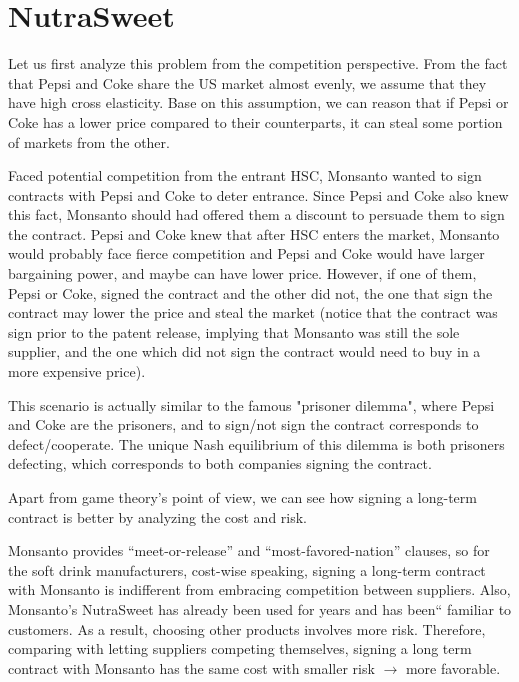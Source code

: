 \documentclass[a4paper]{article}
\begin{document}
    \section{NutraSweet}
    \begin{answer}[problem]
    Let us first analyze this problem from the competition perspective. From the fact that Pepsi and Coke share the US market almost evenly, we assume that they have high cross elasticity. Base on this assumption, we can reason that if Pepsi or Coke has a lower price compared to their counterparts, it can steal some portion of markets from the other.
    
    Faced potential competition from the entrant HSC, Monsanto wanted to sign contracts with Pepsi and Coke to deter entrance. Since Pepsi and Coke also knew this fact, Monsanto should had offered them a discount to persuade them to sign the contract. Pepsi and Coke knew that after HSC enters the market, Monsanto would probably face fierce competition and Pepsi and Coke would have larger bargaining power, and maybe can have lower price. However, if one of them, Pepsi or Coke, signed the contract and the other did not, the one that sign the contract may lower the price and steal the market (notice that the contract was sign prior to the patent release, implying that Monsanto was still the sole supplier, and the one which did not sign the contract would need to buy in a more expensive price). 
    
    This scenario is actually similar to the famous "prisoner dilemma", where Pepsi and Coke are the prisoners, and to sign/not sign the contract corresponds to defect/cooperate. The unique Nash equilibrium of this dilemma is both prisoners defecting, which corresponds to both companies signing the contract.
    
    Apart from game theory's point of view, we can see how signing a long-term contract is better by analyzing the cost and risk.
    
    Monsanto provides “meet-or-release” and “most-favored-nation” clauses, so for the soft drink manufacturers, cost-wise speaking, signing a long-term contract with Monsanto is indifferent from embracing competition between suppliers. Also, Monsanto's NutraSweet has already been used for years and has been`` familiar to customers. As a result, choosing other products involves more risk. Therefore, comparing with letting suppliers competing themselves, signing a long term contract with Monsanto has the same cost with smaller risk $\rightarrow$ more favorable.
    \end{answer}
    
\end{document}
